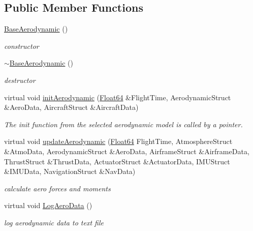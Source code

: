 \subsection*{Public Member Functions}
\begin{DoxyCompactItemize}
\item 
\hyperlink{class_base_aerodynamic_aa05d0598119b1364cdb45cf478ae578c}{Base\+Aerodynamic} ()
\begin{DoxyCompactList}\small\item\em constructor \end{DoxyCompactList}\item 
\hyperlink{class_base_aerodynamic_a81d08f3a779e6e25245b6f3b545920cb}{$\sim$\+Base\+Aerodynamic} ()
\begin{DoxyCompactList}\small\item\em destructor \end{DoxyCompactList}\item 
virtual void \hyperlink{class_base_aerodynamic_a6493b7d9c4cbadcbf3a8e5a6c973e1f3}{init\+Aerodynamic} (\hyperlink{group___tools_ga3f1431cb9f76da10f59246d1d743dc2c}{Float64} \&Flight\+Time, Aerodynamic\+Struct \&Aero\+Data, Aircraft\+Struct \&Aircraft\+Data)
\begin{DoxyCompactList}\small\item\em The init function from the selected aerodynamic model is called by a pointer. \end{DoxyCompactList}\item 
virtual void \hyperlink{class_base_aerodynamic_a8a417495c896359b2ee74f5c1c8c08f7}{update\+Aerodynamic} (\hyperlink{group___tools_ga3f1431cb9f76da10f59246d1d743dc2c}{Float64} Flight\+Time, Atmosphere\+Struct \&Atmo\+Data, Aerodynamic\+Struct \&Aero\+Data, Airframe\+Struct \&Airframe\+Data, Thrust\+Struct \&Thrust\+Data, Actuator\+Struct \&Actuator\+Data, I\+M\+U\+Struct \&I\+M\+U\+Data, Navigation\+Struct \&Nav\+Data)
\begin{DoxyCompactList}\small\item\em calculate aero forces and moments \end{DoxyCompactList}\item 
virtual void \hyperlink{class_base_aerodynamic_abaea76739e197627a6d09cff5b68af83}{Log\+Aero\+Data} ()
\begin{DoxyCompactList}\small\item\em log aerodynamic data to text file \end{DoxyCompactList}\end{DoxyCompactItemize}


